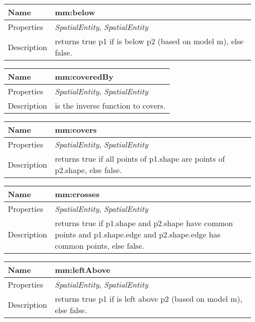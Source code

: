 \begin{tabular}{|p{3cm}|p{10cm}|}
\hline Name & mm:below\\
\hline Properties & \textit{SpatialEntity}, \textit{SpatialEntity} \\
\hline Description & returns true p1 if is below p2 (based on model m), else false.\\
\hline
\end{tabular}
\vspace{0.3cm}
\newline
\begin{tabular}{|p{3cm}|p{10cm}|}
\hline Name & mm:coveredBy\\
\hline Properties & \textit{SpatialEntity}, \textit{SpatialEntity} \\
\hline Description & is the inverse function to covers.\\
\hline
\end{tabular}
\vspace{0.3cm}
\newline
\begin{tabular}{|p{3cm}|p{10cm}|}
\hline Name & mm:covers\\
\hline Properties & \textit{SpatialEntity}, \textit{SpatialEntity} \\
\hline Description & returns true if all points of p1.shape are points of p2.shape, else false. \\
\hline
\end{tabular}
\vspace{0.3cm}
\newline
\begin{tabular}{|p{3cm}|p{10cm}|}
\hline Name & mm:crosses\\
\hline Properties & \textit{SpatialEntity}, \textit{SpatialEntity} \\
\hline Description & returns true if p1.shape and p2.shape have common points and p1.shape.edge and p2.shape.edge has common points, else false.\\
\hline
\end{tabular}
\vspace{0.3cm}
\newline
\begin{tabular}{|p{3cm}|p{10cm}|}
\hline Name & mm:leftAbove\\
\hline Properties & \textit{SpatialEntity}, \textit{SpatialEntity} \\
\hline Description & returns true p1 if is left above p2 (based on model m), else false.\\
\hline
\end{tabular}
